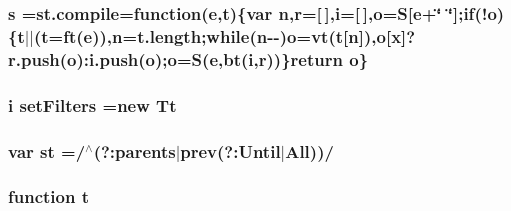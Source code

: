 \hypertarget{jquery-1_89_81_8min_8js_a3691308f2a4c2f6983f2880d32e29c84}{
\subsubsection[{s}]{\setlength{\rightskip}{0pt plus 5cm}s =st.\-compile=function({\bf e},{\bf t})\{var {\bf n},{\bf r}=\mbox{[}$\,$\mbox{]},{\bf i}=\mbox{[}$\,$\mbox{]},{\bf o}={\bf S}\mbox{[}{\bf e}+\char`\"{} \char`\"{}\mbox{]};{\bf if}(!{\bf o})\{{\bf t}$\vert$$\vert$({\bf t}={\bf ft}({\bf e})),{\bf n}=t.\-length;while({\bf n}-\/-\/){\bf o}={\bf vt}({\bf t}\mbox{[}{\bf n}\mbox{]}),{\bf o}\mbox{[}{\bf x}\mbox{]}?r.\-push({\bf o})\-:i.\-push({\bf o});{\bf o}={\bf S}({\bf e},{\bf bt}({\bf i},{\bf r}))\}return {\bf o}\}}}\label{jquery-1_89_81_8min_8js_a3691308f2a4c2f6983f2880d32e29c84}
\hypertarget{jquery-1_89_81_8min_8js_a6f854d82b9ffe4cde3ed4caa26ce2963}{
\subsubsection[{set\-Filters}]{ {\bf i} set\-Filters =new {\bf Tt}}}\label{jquery-1_89_81_8min_8js_a6f854d82b9ffe4cde3ed4caa26ce2963}
\hypertarget{jquery-1_89_81_8min_8js_a119fe127d24908030b95ca1d594219f3}{
\subsubsection[{st}]{\setlength{\rightskip}{0pt plus 5cm}var st =/$^\wedge$(?\-:parents$\vert$prev(?\-:Until$\vert$All))/}}\label{jquery-1_89_81_8min_8js_a119fe127d24908030b95ca1d594219f3}
\hypertarget{jquery-1_89_81_8min_8js_a23c5666e83bbbceee94adcd0851f50c4}{
\subsubsection[{t}]{\setlength{\rightskip}{0pt plus 5cm}function t}}\label{jquery-1_89_81_8min_8js_a23c5666e83bbbceee94adcd0851f50c4}
